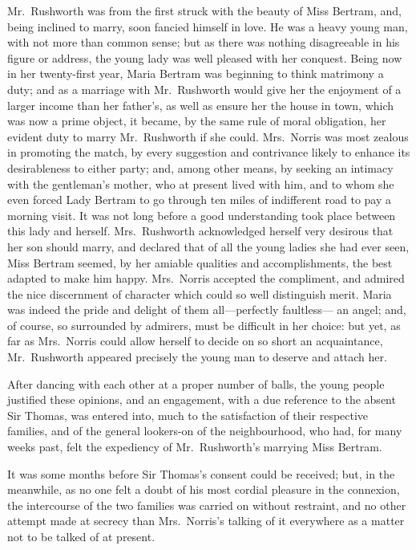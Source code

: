 \documentclass{article}
\begin{document}
Mr.\ Rushworth was from the first struck with the beauty
of Miss Bertram, and, being inclined to marry, soon fancied
himself in love.  He was a heavy young man, with not more
than common sense; but as there was nothing disagreeable
in his figure or address, the young lady was well pleased
with her conquest.  Being now in her twenty-first year,
Maria Bertram was beginning to think matrimony a duty;
and as a marriage with Mr.\ Rushworth would give her the
enjoyment of a larger income than her father's, as well as
ensure her the house in town, which was now a prime object,
it became, by the same rule of moral obligation,
her evident duty to marry Mr.\ Rushworth if she could.
Mrs.\ Norris was most zealous in promoting the match,
by every suggestion and contrivance likely to enhance
its desirableness to either party; and, among other means,
by seeking an intimacy with the gentleman's mother,
who at present lived with him, and to whom she even forced
Lady Bertram to go through ten miles of indifferent road
to pay a morning visit.  It was not long before a good
understanding took place between this lady and herself.
Mrs.\ Rushworth acknowledged herself very desirous that
her son should marry, and declared that of all the young
ladies she had ever seen, Miss Bertram seemed, by her
amiable qualities and accomplishments, the best adapted
to make him happy.  Mrs.\ Norris accepted the compliment,
and admired the nice discernment of character which
could so well distinguish merit.  Maria was indeed
the pride and delight of them all---perfectly faultless---%
an angel; and, of course, so surrounded by admirers, must be
difficult in her choice:  but yet, as far as Mrs.\ Norris
could allow herself to decide on so short an acquaintance,
Mr.\ Rushworth appeared precisely the young man to deserve
and attach her.

After dancing with each other at a proper number of balls,
the young people justified these opinions, and an engagement,
with a due reference to the absent Sir Thomas, was entered into,
much to the satisfaction of their respective families,
and of the general lookers-on of the neighbourhood,
who had, for many weeks past, felt the expediency
of Mr.\ Rushworth's marrying Miss Bertram.

It was some months before Sir Thomas's consent could
be received; but, in the meanwhile, as no one felt
a doubt of his most cordial pleasure in the connexion,
the intercourse of the two families was carried on
without restraint, and no other attempt made at secrecy
than Mrs.\ Norris's talking of it everywhere as a matter
not to be talked of at present.
\end{document}
